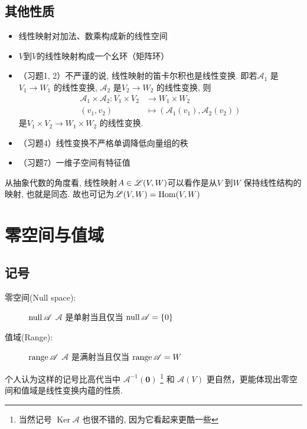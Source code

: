 \subsection{其他性质}
\begin{itemize}
    \item 线性映射对加法、数乘构成新的线性空间
    \item \(V\)到\(V\)的线性映射构成一个幺环（矩阵环）
    \item （习题1, 2）不严谨的说, 线性映射的笛卡尔积也是线性变换. 即若\(\mathscr{A}_{1}\)
        是\(V_{1} \to W_{1}\) 的线性变换, \(\mathscr{A}_{2}\)
        是\(V_{2} \to W_{2}\) 的线性变换, 则
        \begin{align*}
            \mathscr{A}_{1} \times \mathscr{A}_{2} : V_{1}
            \times V_{2} &\to W_{1} \times W_{2}\\
            (v_{1},v_{2}) &\mapsto
            (\mathscr{A}_{1}(v_{1}),\mathscr{A}_{2}(v_{2}))
        \end{align*}
        是\(V_{1} \times V_{2} \to
        W_{1} \times W_{2}\) 的线性变换.
    \item （习题4）线性变换不严格单调降低向量组的秩
    \item （习题7）一维子空间有特征值
\end{itemize}

从抽象代数的角度看, 线性映射\(A \in \mathscr{L}(V,W)\)可以看作是从\(V\) 到\(W\)
保持线性结构的映射, 也就是同态. 故也可记为\(\mathscr{L}(V,W)=\operatorname{Hom}(V,W)\)

\section{零空间与值域}
\subsection{记号}
\begin{description}
    \item[零空间(Null space):] \(\operatorname{null} \mathscr{A}\)
        \(\mathscr{A}\) 是单射当且仅当
        \(\operatorname{null} \mathscr{A} = \{0\}\)
    \item[值域(Range):] \(\operatorname{range} \mathscr{A}\)
        \(\mathscr{A}\) 是满射当且仅当
        \(\operatorname{range} \mathscr{A} = W\)
\end{description}
个人认为这样的记号比高代当中 \(\mathscr{A}^{-1}(\mathbf{0})\)
\footnote{当然记号 \(\operatorname{Ker} \mathscr{A}\) 也很不错的,
因为它看起来更酷一些 } 和 \(\mathscr{A}(V)\)
更自然，更能体现出零空间和值域是线性变换内蕴的性质.

